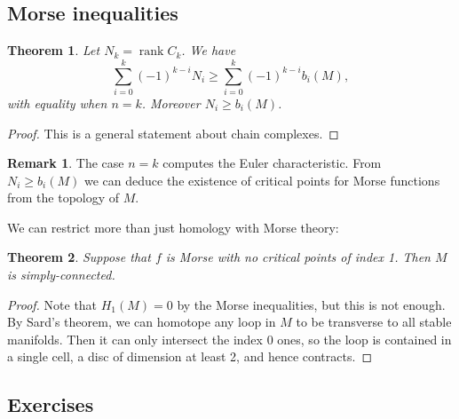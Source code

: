 \documentclass{article}
\newtheorem*{theorem}{Theorem}
\theoremstyle{definition}
\newtheorem*{remark}{Remark}
\DeclareMathOperator{\rank}{rank}
\begin{document}
\subsection*{Morse inequalities}

\begin{theorem}
    Let $N_k=\rank C_k$. We have
    \begin{equation*}
        \sum_{i=0}^k(-1)^{k-i}N_i\ge\sum_{i=0}^k(-1)^{k-i}b_i(M),
    \end{equation*}
    with equality when $n=k$. Moreover $N_i\ge b_i(M)$.
\end{theorem}

\begin{proof}
    This is a general statement about chain complexes.
\end{proof}

\begin{remark}
    The case $n=k$ computes the Euler characteristic. From $N_i\ge b_i(M)$ we
    can deduce the existence of critical points for Morse functions from the
    topology of $M$.
\end{remark}

We can restrict more than just homology with Morse theory:

\begin{theorem}
    Suppose that $f$ is Morse with no critical points of index 1. Then $M$ is
    simply-connected.
\end{theorem}

\begin{proof}
    Note that $H_1(M)=0$ by the Morse inequalities, but this is not enough. By
    Sard's theorem, we can homotope any loop in $M$ to be transverse to all
    stable manifolds. Then it can only intersect the index 0 ones, so the loop
    is contained in a single cell, a disc of dimension at least 2, and hence
    contracts.
\end{proof}

\subsection*{Exercises}
\end{document}
